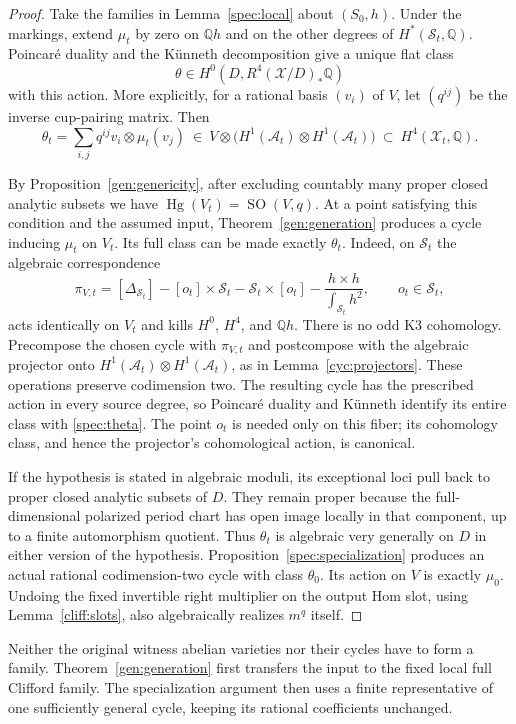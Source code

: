 \begin{proof}
Take the families in Lemma~\ref{spec:local} about $(S_0,h)$.
Under the markings, extend $\mu_t$ by zero on $\mathbb Qh$ and on the
other degrees of $H^*(\mathcal S_t,\mathbb Q)$.
Poincar\'e duality and the K\"unneth decomposition give a unique flat
class
\[
 \theta\in H^0(D,R^4(\mathcal X/D)_*\mathbb Q)
\]
with this action.  More explicitly, for a rational basis $(v_i)$ of
$V$, let $(q^{ij})$ be the inverse cup-pairing matrix.  Then
\begin{equation}
 \label{spec:theta}
 \theta_t=\sum_{i,j}q^{ij}v_i\otimes\mu_t(v_j)
 \ \in\ V\otimes
 \bigl(H^1(\mathcal A_t)\otimes H^1(\mathcal A_t)\bigr)
 \ \subset\ H^4(\mathcal X_t,\mathbb Q).
\end{equation}

By Proposition~\ref{gen:genericity}, after excluding countably many
proper closed analytic subsets we have
$\operatorname{Hg}(V_t)=\operatorname{SO}(V,q)$.
At a point satisfying this condition and the assumed input,
Theorem~\ref{gen:generation} produces a cycle inducing $\mu_t$ on $V_t$.
Its full class can be made exactly $\theta_t$.
Indeed, on $\mathcal S_t$ the algebraic correspondence
\begin{equation}
 \label{spec:primitive-projector}
 \pi_{V,t}=[\Delta_{\mathcal S_t}]
 -[o_t]\times\mathcal S_t-\mathcal S_t\times[o_t]
 -\frac{h\times h}{\int_{\mathcal S_t}h^2},
 \qquad o_t\in\mathcal S_t,
\end{equation}
acts identically on $V_t$ and kills $H^0$, $H^4$, and $\mathbb Qh$.
There is no odd K3 cohomology.  Precompose the chosen cycle with
$\pi_{V,t}$ and postcompose with the algebraic projector onto
$H^1(\mathcal A_t)\otimes H^1(\mathcal A_t)$, as in
Lemma~\ref{cyc:projectors}.  These operations preserve codimension two.
The resulting cycle has the prescribed action in every source degree,
so Poincar\'e duality and K\"unneth identify its entire class with
\eqref{spec:theta}.  The point $o_t$ is needed only on this fiber; its
cohomology class, and hence the projector's cohomological action, is
canonical.

If the hypothesis is stated in algebraic moduli, its exceptional loci
pull back to proper closed analytic subsets of $D$.  They remain proper
because the full-dimensional polarized period chart has open image
locally in that component, up to a finite automorphism quotient.
Thus $\theta_t$ is algebraic very generally on $D$ in either version
of the hypothesis.  Proposition~\ref{spec:specialization} produces an
actual rational codimension-two cycle with class $\theta_0$.
Its action on $V$ is exactly $\mu_0$. Undoing the fixed invertible right multiplier on the output Hom slot, using Lemma~\ref{cliff:slots}, also algebraically realizes $m^q$ itself.
\end{proof}

Neither the original witness abelian varieties nor their cycles have
to form a family.  Theorem~\ref{gen:generation} first transfers the
input to the fixed local full Clifford family.  The specialization
argument then uses a finite representative of one sufficiently general
cycle, keeping its rational coefficients unchanged.
